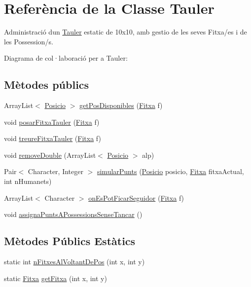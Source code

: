 \hypertarget{class_tauler}{}\section{Referència de la Classe Tauler}
\label{class_tauler}


Administració d\textquotesingle{}un \mbox{\hyperlink{class_tauler}{Tauler}} estatic de 10x10, amb gestio de les seves Fitxa/es i de les Possession/s.  




Diagrama de col·laboració per a Tauler\+:
\subsection*{Mètodes públics}
\begin{DoxyCompactItemize}
\item 
Array\+List$<$ \mbox{\hyperlink{class_posicio}{Posicio}} $>$ \mbox{\hyperlink{class_tauler_af4c6190c83c0a48f83b08f8892fd3413}{get\+Pos\+Disponibles}} (\mbox{\hyperlink{class_fitxa}{Fitxa}} f)
\item 
void \mbox{\hyperlink{class_tauler_aa06ab791d1dc23451170b09f1aa4626c}{posar\+Fitxa\+Tauler}} (\mbox{\hyperlink{class_fitxa}{Fitxa}} f)
\item 
void \mbox{\hyperlink{class_tauler_ad52694ab07b38f083c68d119701a72c8}{treure\+Fitxa\+Tauler}} (\mbox{\hyperlink{class_fitxa}{Fitxa}} f)
\item 
void \mbox{\hyperlink{class_tauler_acf7a86eabba38a184bb227e41d1ec447}{remove\+Double}} (Array\+List$<$ \mbox{\hyperlink{class_posicio}{Posicio}} $>$ alp)
\item 
Pair$<$ Character, Integer $>$ \mbox{\hyperlink{class_tauler_a0a7e35375e0863e69cbb531232fcc3ce}{simular\+Punts}} (\mbox{\hyperlink{class_posicio}{Posicio}} posicio, \mbox{\hyperlink{class_fitxa}{Fitxa}} fitxa\+Actual, int n\+Humanets)
\item 
Array\+List$<$ Character $>$ \mbox{\hyperlink{class_tauler_a936880dfa43da6f75cdad1edd82495c2}{on\+Es\+Pot\+Ficar\+Seguidor}} (\mbox{\hyperlink{class_fitxa}{Fitxa}} f)
\item 
void \mbox{\hyperlink{class_tauler_aad088ac51b768b7c12b9a9862207f3fb}{assigna\+Punts\+A\+Possessions\+Sense\+Tancar}} ()
\end{DoxyCompactItemize}
\subsection*{Mètodes Públics Estàtics}
\begin{DoxyCompactItemize}
\item 
static int \mbox{\hyperlink{class_tauler_af5a38a09a2f0cfb5f87519f0ec327552}{n\+Fitxes\+Al\+Voltant\+De\+Pos}} (int x, int y)
\item 
static \mbox{\hyperlink{class_fitxa}{Fitxa}} \mbox{\hyperlink{class_tauler_aaed75eb94f6022165789d1941aac603c}{get\+Fitxa}} (int x, int y)
\end{DoxyCompactItemize}
